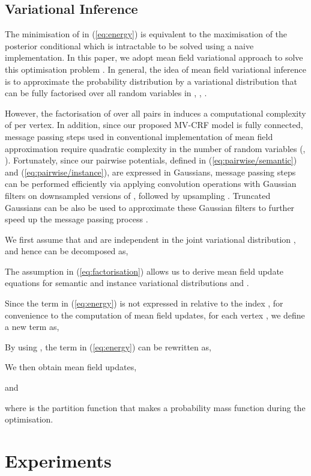 \documentclass[10pt,twocolumn,letterpaper]{article}
\begin{document}
\subsection{Variational Inference}

The minimisation of  in (\ref{eq:energy}) is equivalent to the
maximisation of the posterior conditional  which is intractable to
be solved using a naive implementation. In this paper, we adopt mean field
variational approach to solve this optimisation problem
\cite{wainwright-graphical-ftml08}. In general, the idea of mean field
variational inference is to approximate the probability distribution
 by a variational distribution  that can be fully
factorised over all random variables in , \ie,
.

However, the factorisation of  over all pairs in 
induces a computational complexity of  per vertex. In addition,
since our proposed MV-CRF model is fully connected, message passing steps used
in conventional implementation of mean field approximation require quadratic
complexity in the number of random variables (\ie, ). Fortunately, since our
pairwise potentials, defined in (\ref{eq:pairwise/semantic}) and
(\ref{eq:pairwise/instance}), are expressed in Gaussians, message passing steps
can be performed efficiently via applying convolution operations with Gaussian
filters on downsampled versions of , followed by upsampling
\cite{krahenbuhl-densecrf-nips11}. Truncated Gaussians can be also be used to
approximate these Gaussian filters to further speed up the message passing
process \cite{paris-bilateral-eccv06}.

We first assume that  and  are independent in the joint variational
distribution , and hence  can be decomposed as,


The assumption in (\ref{eq:factorisation}) allows us to derive mean field update
equations for semantic and instance variational distributions  and .

Since the term  in (\ref{eq:energy}) is
not expressed in relative to the index , for convenience to the computation
of mean field updates, for each vertex , we define a new term  as,


By using , the term  in
(\ref{eq:energy}) can be rewritten as,


We then obtain mean field updates,

and

where  is the partition function that makes  a probability mass
function during the optimisation.
 \section{Experiments}
\label{sec:experiments}
\end{document}
